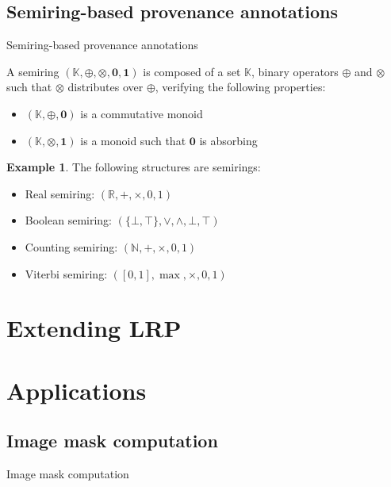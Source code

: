 \documentclass[aspectratio=169]{beamer}
\theoremstyle{definition}
\newtheorem*{exemple}{Example}
\begin{document}
\subsection{Semiring-based provenance annotations}
\begin{frame}{Semiring-based provenance annotations}
    \begin{definition}[Semiring]
        A semiring $(\mathbb{K}, \oplus, \otimes, \mathbf{0}, \mathbf{1})$ is composed of a set $\mathbb{K}$, binary operators $\oplus$ and $\otimes$ such that $\otimes$ distributes over $\oplus$, verifying the following properties:
        \begin{itemize}[label=--, noitemsep]
            \item $(\mathbb{K}, \oplus, \mathbf{0})$ is a commutative monoid
            \item $(\mathbb{K}, \otimes, \mathbf{1})$ is a monoid such that $\mathbf{0}$ is absorbing
        \end{itemize}
    \end{definition}

    \begin{exemple}
        The following structures are semirings:
        \begin{itemize}[label=--, noitemsep]
            \item Real semiring: $(\mathbb{R}, +, \times, 0, 1)$
            \item Boolean semiring: $(\{\bot, \top\}, \lor, \land, \bot, \top)$
            \item Counting semiring: $(\mathbb{N}, +, \times, 0, 1)$
            \item Viterbi semiring: $([0, 1], \max, \times, 0, 1)$
        \end{itemize}
    \end{exemple}
\end{frame}

\section{Extending LRP}

\section{Applications}
\subsection{Image mask computation}
\begin{frame}{Image mask computation}
    
\end{frame}
\end{document}
